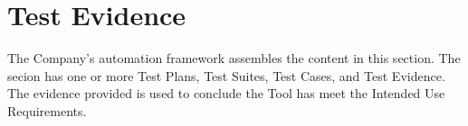 \clearpage
\section{Test Evidence}
The Company's automation framework assembles the content in this section.  The
secion has one or more Test Plans, Test Suites, Test Cases, and Test Evidence.
The evidence provided is used to conclude the Tool has meet the Intended Use
Requirements.

